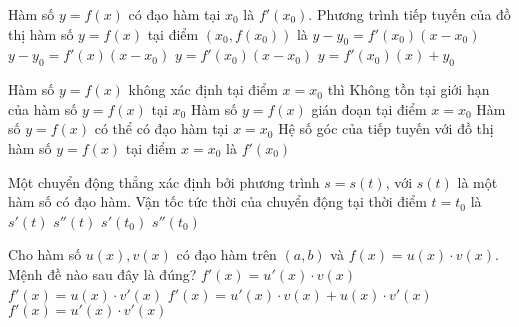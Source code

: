 \begin{ex}%
	Hàm số $y=f(x)$ có đạo hàm tại $x_0$ là $f'(x_0)$. Phương trình tiếp tuyến của đồ thị hàm số $y=f(x)$ tại điểm $\left(x_0,f(x_0)\right)$ là
	\choice
	{\True $y-y_0 = f'(x_0)(x-x_0)$}
	{$y-y_0 = f'(x)(x-x_0)$}
	{$y = f'(x_0)(x-x_0)$}
	{$y= f'(x_0)(x) + y_0$}
\end{ex}


\begin{ex}%
	Hàm số $y=f(x)$ không xác định tại điểm $x=x_0$ thì
	\choice
	{Không tồn tại giới hạn của hàm số $y=f(x)$ tại $x_0$}
	{\True Hàm số $y=f(x)$ gián đoạn tại điểm $x=x_0$}
	{Hàm số $y=f(x)$ có thể có đạo hàm tại $x=x_0$}
	{Hệ số góc của tiếp tuyến với đồ thị hàm số $y=f(x)$ tại điểm $x=x_0$ là $f'(x_0)$}
\end{ex}

\begin{ex}%
	Một chuyển động thẳng xác định bởi phương trình $s=s(t)$, với $s(t)$ là một hàm số có đạo hàm. Vận tốc tức thời của chuyển động tại thời điểm $t=t_0$ là
	\choice
	{$s'(t)$}
	{$s''(t)$}
	{\True $s'(t_0)$}
	{$s''(t_0)$}
\end{ex}

\begin{ex}%
	Cho hàm số $u(x), v(x)$ có đạo hàm trên $(a,b)$ và $f(x)=u(x)\cdot v(x)$. Mệnh đề nào sau đây là đúng?
	\choice
	{$f'(x)=u'(x)\cdot v(x)$}
	{$f'(x)=u(x)\cdot v'(x)$}
	{\True $f'(x)=u'(x)\cdot v(x)+u(x)\cdot v'(x)$}
	{$f'(x)=u'(x)\cdot v'(x)$}
\end{ex}

